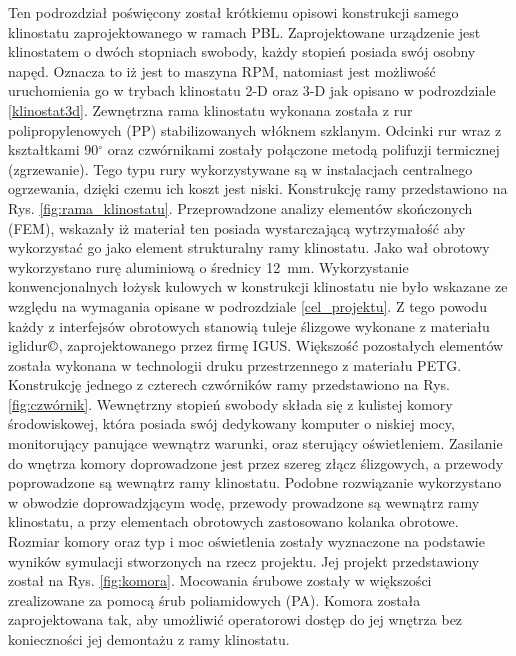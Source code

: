Ten podrozdział poświęcony został krótkiemu opisowi konstrukcji samego klinostatu
 zaprojektowanego w ramach PBL. Zaprojektowane urządzenie jest klinostatem o dwóch stopniach
  swobody, każdy stopień posiada swój osobny napęd. Oznacza to iż jest to maszyna RPM, natomiast
   jest możliwość uruchomienia go w trybach klinostatu 2-D oraz 3-D jak opisano w podrozdziale
    \ref{klinostat3d}. Zewnętrzna rama klinostatu wykonana została z rur polipropylenowych (PP)
     stabilizowanych włóknem szklanym. Odcinki rur wraz z kształtkami 90$^\circ$ oraz
      czwórnikami zostały połączone metodą polifuzji termicznej (zgrzewanie). Tego typu rury
       wykorzystywane są w instalacjach centralnego ogrzewania, dzięki czemu ich koszt jest
        niski. Konstrukcję ramy przedstawiono na Rys. \ref{fig:rama_klinostatu}. Przeprowadzone
         analizy elementów skończonych (FEM), wskazały iż materiał ten posiada wystarczającą
          wytrzymałość aby wykorzystać go jako element strukturalny ramy klinostatu. Jako wał
           obrotowy wykorzystano rurę aluminiową o średnicy \SI{12}{mm}. Wykorzystanie
            konwencjonalnych łożysk kulowych w konstrukcji klinostatu nie było wskazane ze
             względu na wymagania opisane w podrozdziale \ref{cel_projektu}. Z tego powodu każdy
              z interfejsów obrotowych stanowią tuleje ślizgowe wykonane z materiału
               iglidur$\copyright$, zaprojektowanego przez firmę IGUS. Większość pozostałych
                elementów została wykonana w technologii druku przestrzennego z materiału PETG.
                 Konstrukcję jednego z czterech czwórników ramy przedstawiono na Rys.
                  \ref{fig:czwórnik}. Wewnętrzny stopień swobody składa się z kulistej komory
                   środowiskowej, która posiada swój dedykowany komputer o niskiej mocy,
                    monitorujący panujące wewnątrz warunki, oraz sterujący oświetleniem.
                     Zasilanie do wnętrza komory doprowadzone jest przez szereg złącz
                      ślizgowych, a przewody poprowadzone są wewnątrz ramy klinostatu. Podobne
                       rozwiązanie wykorzystano w obwodzie doprowadzjącym wodę, przewody
                        prowadzone są wewnątrz ramy klinostatu, a przy elementach obrotowych
                         zastosowano kolanka obrotowe. Rozmiar komory oraz typ i moc oświetlenia
                          zostały wyznaczone na podstawie wyników symulacji stworzonych na rzecz
                           projektu. Jej projekt przedstawiony został na Rys. \ref{fig:komora}.
                            Mocowania śrubowe zostały w większości zrealizowane za pomocą śrub
                             poliamidowych (PA). Komora została zaprojektowana tak, aby
                              umożliwić operatorowi dostęp do jej wnętrza bez konieczności jej
                               demontażu z ramy klinostatu.
                               


